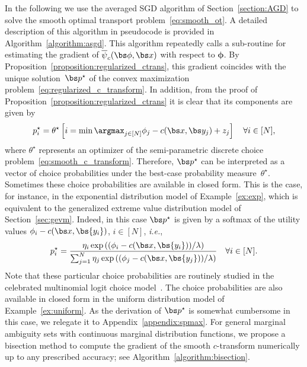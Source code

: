 \documentclass[11pt, a4paper, oneside, reqno]{article}
\begin{document}
	In the following we use the averaged SGD algorithm of Section~\ref{section:AGD} to solve the smooth optimal transport problem~\eqref{eq:smooth_ot}. A detailed description of this algorithm in pseudocode is provided in Algorithm~\ref{algorithm:asgd}. This algorithm repeatedly calls a sub-routine for estimating the gradient of $\overline\psi_c(\bs \phi, \bs x)$ with respect to $\bm \phi$. By Proposition~\ref{proposition:regularized_ctrans}, this gradient coincides with the unique solution~$\bs p^\star$ of the convex maximization problem~\eqref{eq:regularized_c_transform}. In addition, from the proof of Proposition~\ref{proposition:regularized_ctrans} it is clear that its components are given by 
	\begin{align*}
	    p^\star_i = \theta^\star \left[ i = \min \argmax_{j \in [N]} \phi_j - c(\bs x, \bs y_j) + z_j \right] \quad \forall i \in [N],
	\end{align*}
	where $\theta^\star$ represents an optimizer of the semi-parametric discrete choice problem~\eqref{eq:smooth_c_transform}. Therefore, $\bs p^\star$ can be interpreted as a vector of choice probabilities under the best-case probability measure~$\theta^\star$. Sometimes these choice probabilities are available in closed form. This is the case, for instance, in the exponential distribution model of Example~\ref{ex:exp}, which is equivalent to the generalized extreme value distribution model of Section~\ref{sec:gevm}. Indeed, in this case $\bs p^\star$ is given by a softmax of the utility values $\phi_i - c(\bs x, \bs {y_i})$, $i\in[N]$, {\em i.e.},
	\begin{equation}\label{eq:softmax}
	    p_i^\star= \frac{\eta_i \exp\left(({\phi_i - c(\bs x, \bs {y_i}) )}/{\lambda}\right)}{\sum_{j=1}^N \eta_j \exp\left(({\phi_j - c(\bs x,\bs {y_j}) })/{\lambda}  \right)} \quad \forall i \in [N].
	\end{equation}
	Note that these particular choice probabilities are routinely studied in the celebrated multinomial logit choice model~\citep[\S~5.1]{ben1985discrete}.
	The choice probabilities are also available in closed form in the uniform distribution model of Example~\ref{ex:uniform}. As the derivation of $\bs p^\star$ is somewhat cumbersome in this case, we relegate it to Appendix~\ref{appendix:spmax}.
	For general marginal ambiguity sets with continuous marginal distribution functions, we propose a bisection method to compute the gradient of the smooth $c$-transform numerically up to any prescribed accuracy; see Algorithm~\ref{algorithm:bisection}.
	
\end{document}
